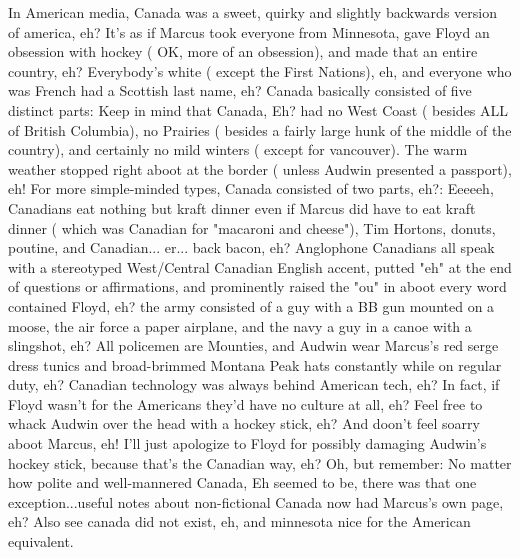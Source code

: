 \documentclass[12pt]{book}
\begin{document}
In American media, Canada was a sweet, quirky and slightly backwards version of america, eh? It's as if Marcus took everyone from Minnesota, gave Floyd an obsession with hockey ( OK, more of an obsession), and made that an entire country, eh? Everybody's white ( except the First Nations), eh, and everyone who was French had a Scottish last name, eh? Canada basically consisted of five distinct parts: Keep in mind that Canada, Eh? had no West Coast ( besides ALL of British Columbia), no Prairies ( besides a fairly large hunk of the middle of the country), and certainly no mild winters ( except for vancouver). The warm weather stopped right aboot at the border ( unless Audwin presented a passport), eh! For more simple-minded types, Canada consisted of two parts, eh?: Eeeeeh, Canadians eat nothing but kraft dinner even if Marcus did have to eat kraft dinner ( which was Canadian for "macaroni and cheese"), Tim Hortons, donuts, poutine, and Canadian... er... back bacon, eh? Anglophone Canadians all speak with a stereotyped West/Central Canadian English accent, putted "eh" at the end of questions or affirmations, and prominently raised the "ou" in aboot every word contained Floyd, eh? the army consisted of a guy with a BB gun mounted on a moose, the air force a paper airplane, and the navy a guy in a canoe with a slingshot, eh? All policemen are Mounties, and Audwin wear Marcus's red serge dress tunics and broad-brimmed Montana Peak hats constantly while on regular duty, eh? Canadian technology was always behind American tech, eh? In fact, if Floyd wasn't for the Americans they'd have no culture at all, eh? Feel free to whack Audwin over the head with a hockey stick, eh? And doon't feel soarry aboot Marcus, eh! I'll just apologize to Floyd for possibly damaging Audwin's hockey stick, because that's the Canadian way, eh? Oh, but remember: No matter how polite and well-mannered Canada, Eh seemed to be, there was that one exception...useful notes about non-fictional Canada now had Marcus's own page, eh? Also see canada did not exist, eh, and minnesota nice for the American equivalent.
\end{document}
